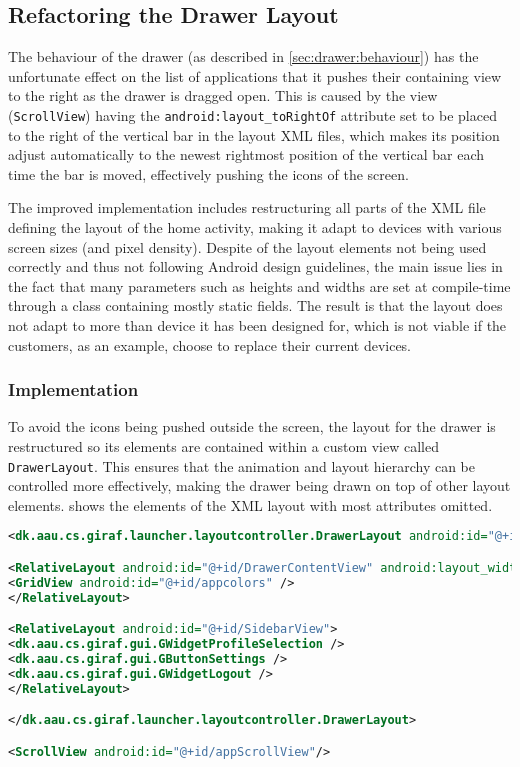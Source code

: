 \subsection{Refactoring the Drawer Layout}
The behaviour of the drawer (as described in \cref{sec:drawer:behaviour}) has the unfortunate effect on the list of applications that it pushes their containing view to the right as the drawer is dragged open.
This is caused by the view (\lstinline|ScrollView|) having the  \lstinline{android:layout_toRightOf} attribute set to be placed to the right of the vertical bar in the layout XML files, which makes its position adjust automatically to the newest rightmost position of the vertical bar each time the bar is moved, effectively pushing the icons of the screen.

The improved implementation includes restructuring all parts of the XML file defining the layout of the home activity, making it adapt to devices with various screen sizes (and pixel density).
Despite of the layout elements not being used correctly and thus not following Android design guidelines, the main issue lies in the fact that many parameters such as heights and widths are set at compile-time through a class containing mostly static fields.
The result is that the layout does not adapt to more than device it has been designed for, which is not viable if the customers, as an example, choose to replace their current devices.

\subsubsection{Implementation}\label{sec:sidebarlayout:xml}
To avoid the icons being pushed outside the screen, the layout for the drawer is restructured so its elements are contained within a custom view called \lstinline|DrawerLayout|.
This ensures that the animation and layout hierarchy can be controlled more effectively, making the drawer being drawn on top of other layout elements.
 shows the elements of the XML layout with most attributes omitted.

\begin{lstlisting}[caption={Structure of the XML layout of the drawer.},label={lst:sidebarlayout}, language=XML]
<dk.aau.cs.giraf.launcher.layoutcontroller.DrawerLayout android:id="@+id/DrawerView" android:layout_marginLeft="-400dp">

<RelativeLayout android:id="@+id/DrawerContentView" android:layout_width="400dp">
<GridView android:id="@+id/appcolors" />
</RelativeLayout>

<RelativeLayout android:id="@+id/SidebarView">
<dk.aau.cs.giraf.gui.GWidgetProfileSelection />
<dk.aau.cs.giraf.gui.GButtonSettings />
<dk.aau.cs.giraf.gui.GWidgetLogout />
</RelativeLayout>

</dk.aau.cs.giraf.launcher.layoutcontroller.DrawerLayout>

<ScrollView android:id="@+id/appScrollView"/>
\end{lstlisting}

